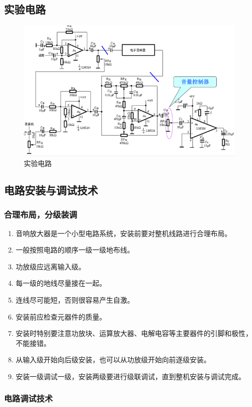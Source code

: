 \documentclass[a4paper]{article}
\theoremstyle{definition}
\theoremstyle{plain}
\theoremstyle{remark}
\begin{document}
\subsection{实验电路}
\begin{figure}[H]
	\centering
	\includegraphics[width=1\textwidth]{实验电路}
	\caption{实验电路}
	\label{实验电路}
\end{figure}
\subsection{电路安装与调试技术}
\subsubsection{合理布局，分级装调}
\begin{enumerate}
	\item 音响放大器是一个小型电路系统，安装前要对整机线路进行合理布局。
	\item	一般按照电路的顺序一级一级地布线。
	\item	功放级应远离输入级。
	\item	每一级的地线尽量接在一起。
	\item	连线尽可能短，否则很容易产生自激。
	\item	安装前应检查元器件的质量。
	\item	安装时特别要注意功放块、运算放大器、电解电容等主要器件的引脚和极性，不能接错。
	\item	从输入级开始向后级安装，也可以从功放级开始向前逐级安装。
	\item	安装一级调试一级，安装两级要进行级联调试，直到整机安装与调试完成。
\end{enumerate}

\subsubsection{电路调试技术}
\end{document}
